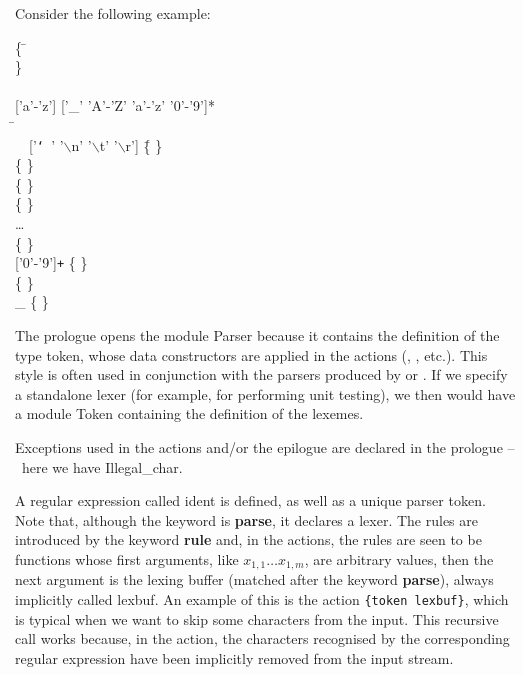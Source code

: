 Consider the following example:
\begin{tabbing}
\{ \= \Xopen {}\\
   \> \Xexception {} \Xof {} \}\\
\\
\Xlet {} \equal \textsf{['a'-'z'] ['\_' 'A'-'Z' 'a'-'z' '0'-'9']*}\\
\Xrule \=  \equal \Xparse\\
  \> \ \ \textsf{['{\tt\char`\ }' '\(\backslash\)n' '\(\backslash\)t'
   '\(\backslash\)r']} \= \{   \}\\
  \> \vbar{}  \> \{ \Tlet \}\\
  \> \vbar{}  \> \{ \Trec \}\\
  \> \vbar{} \str{=}   \> \{ \Tequal \}\\
  \> \ldots \\
  \> \vbar{}  \Xas {} \> \{ \Tident {} \}\\
  \> \vbar{} \textsf{['0'-'9']\texttt{+}} \Xas {} \> \{ \Tint
     \lpar{} \rpar{} \}\\
  \> \vbar{}  \> \{ \Teof \}\\
  \> \vbar{} {\large \_} \Xas {} \> \{  
     \lpar{}  \rpar{} \}
\end{tabbing}
The prologue opens the module \textsf{Parser} because it contains the
definition of the type \textsf{token}, whose data constructors are
applied in the actions (, , etc.). This style is
often used in conjunction with the parsers produced by \menhir or
\ocamlyacc. If we specify a standalone lexer (for example, for
performing unit testing), we then would have a module \textsf{Token}
containing the definition of the lexemes.

Exceptions used in the actions and/or the epilogue are declared in the
prologue --~here we have \textsf{Illegal\_char}.

A regular expression called \textsf{ident} is defined, as well as a
unique parser \textsf{token}. Note that, although the \ocamllex
keyword is \textbf{\textsf{parse}}, it declares a lexer. The rules are
introduced by the keyword \textbf{\textsf{rule}} and, in the actions,
the rules are seen to be functions whose first arguments, like
\(x_{1,1} \dots x_{1,m}\), are arbitrary \OCaml values, then the next
argument is the lexing buffer (matched after the keyword
\textbf{\textsf{parse}}), always implicitly called \textsf{lexbuf}. An
example of this is the action \texttt{\{token lexbuf\}}, which is
typical when we want to skip some characters from the input. This
recursive call works because, in the action, the characters recognised
by the corresponding regular expression have been implicitly removed
from the input stream.

